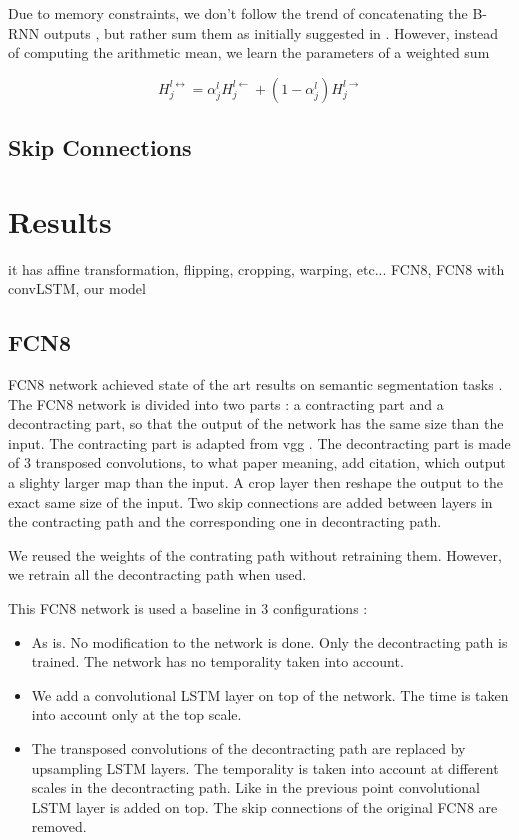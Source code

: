 Due to memory constraints, we don't follow the trend of concatenating the B-RNN
outputs \cite{}, but rather sum them as initially suggested in
\cite{Schuster1997bidirecrnn}. However, instead of computing the arithmetic
mean, we learn the parameters of a weighted sum

\[ H_j^{l\leftrightarrow} = \alpha_j^{l} H_j^{l\leftarrow} + (1 - \alpha_j^{l}) H_j^{l\rightarrow}\]

\subsection{Skip Connections}


\section{Results}\label{sec:deconvRNN_results}

it has affine transformation, flipping, cropping, warping, etc...
FCN8, FCN8 with convLSTM, our model
\subsection{FCN8}
FCN8 network achieved state of the art results on semantic segmentation tasks
\cite{DBLP:conf/cvpr/LongSD15}. The FCN8 network is divided into two parts : a
contracting part and a decontracting part, so that the output of the network
has the same size than the input. The contracting part is adapted from vgg
\cite{Simonyan14vgg}. The decontracting part is made of 3 transposed
convolutions, to what paper meaning, add citation, which output a slighty
larger map than the input. A crop layer then reshape the output to the exact
same size of the input. Two skip connections are added between layers in the
contracting path and the corresponding one in decontracting path.

We reused the weights of the contrating path without retraining them. However,
we retrain all the decontracting path when used.

This FCN8 network is used a baseline in 3 configurations :
\begin{itemize}
    \item As is. No modification to the network is done. Only the decontracting
        path is trained. The network has no temporality taken into account.
    \item We add a convolutional LSTM layer on top of the network. The time is
        taken into account only at the top scale.
    \item The transposed convolutions of the decontracting path are replaced by
        upsampling LSTM layers. The temporality is taken into account at
        different scales in the decontracting path. Like in the previous point
        convolutional LSTM layer is added on top. The skip connections of the
        original FCN8 are removed.
\end{itemize}


